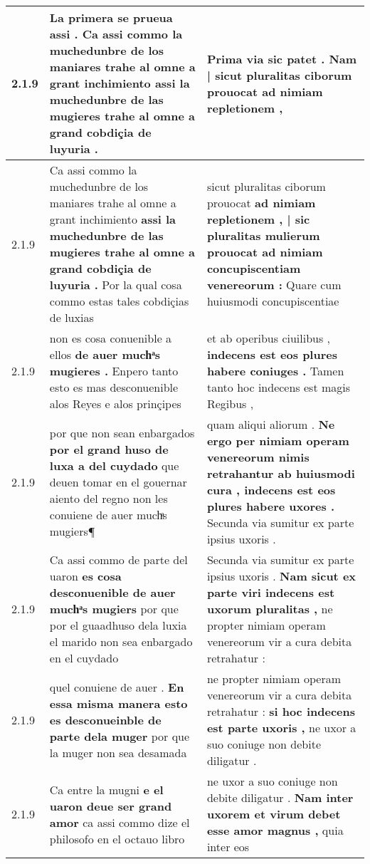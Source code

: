 \begin{tabular}{|p{1cm}|p{6.5cm}|p{6.5cm}|}
2.1.9 & La primera se prueua assi . \textbf{ Ca assi commo la muchedunbre de los maniares trahe al omne a grant inchimiento } assi la muchedunbre de las mugieres trahe al omne a grand cobdiçia de luyuria . & Prima via sic patet . \textbf{ Nam | sicut pluralitas ciborum prouocat } ad nimiam repletionem , \\\hline
2.1.9 & Ca assi commo la muchedunbre de los maniares trahe al omne a grant inchimiento \textbf{ assi la muchedunbre de las mugieres trahe al omne a grand cobdiçia de luyuria . } Por la qual cosa commo estas tales cobdiçias de luxias & sicut pluralitas ciborum prouocat \textbf{ ad nimiam repletionem , | sic pluralitas mulierum prouocat ad nimiam concupiscentiam venereorum : } Quare cum huiusmodi concupiscentiae \\\hline
2.1.9 & non es cosa conuenible a ellos \textbf{ de auer muchͣs mugieres . } Enpero tanto esto es mas desconuenible alos Reyes e alos prinçipes & et ab operibus ciuilibus , \textbf{ indecens est eos plures habere coniuges . } Tamen tanto hoc indecens est magis Regibus , \\\hline
2.1.9 & por que non sean enbargados \textbf{ por el grand huso de luxa a del cuydado } que deuen tomar en el gouernar aiento del regno non les conuiene de auer muchͣs mugiers¶ & quam aliqui aliorum . \textbf{ Ne ergo per nimiam operam venereorum nimis retrahantur ab huiusmodi cura , indecens est eos plures habere uxores . } Secunda via sumitur ex parte ipsius uxoris . \\\hline
2.1.9 & Ca assi commo de parte del uaron \textbf{ es cosa desconuenible de auer muchͣs mugiers } por que por el guaadhuso dela luxia el marido non sea enbargado en el cuydado & Secunda via sumitur ex parte ipsius uxoris . \textbf{ Nam sicut ex parte viri indecens est uxorum pluralitas , } ne propter nimiam operam venereorum vir a cura debita retrahatur : \\\hline
2.1.9 & quel conuiene de auer . \textbf{ En essa misma manera esto es desconueinble de parte dela muger } por que la muger non sea desamada & ne propter nimiam operam venereorum vir a cura debita retrahatur : \textbf{ si hoc indecens est parte uxoris , } ne uxor a suo coniuge non debite diligatur . \\\hline
2.1.9 & Ca entre la mugni \textbf{ e el uaron deue ser grand amor } ca assi commo dize el philosofo en el octauo libro & ne uxor a suo coniuge non debite diligatur . \textbf{ Nam inter uxorem et virum debet esse amor magnus , } quia inter eos \\\hline

\end{tabular}
